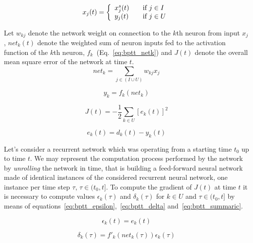 \begin{equation}
x_j(t) = \left\{
\begin{array}{l l}
	x^{s}_{j}(t)	& \quad \text{if $j \in I$} \\
	y_j(t)	& \quad \text{if $j \in U$}\\
\end{array} \right.
\label{eq:bptt_indices}
\end{equation}

\noindent Let $w_{kj}$ denote the network weight on connection to the $k$th neuron from input $x_j$, $net_k(t)$ denote the weighted sum of neuron inputs fed to the activation function of the $k$th neuron, $f_k$~(Eq.~\ref{eq:bptt_netk}) and $J(t)$ denote the overall mean square error of the network at time $t$.
\begin{equation}
net_k = \sum_{j \in (I \cup U)} w_{kj} x_j
\label{eq:bptt_netk}
\end{equation}

\begin{equation}
y_k = f_k(net_k)
\label{eq:bptt_f}
\end{equation}

\begin{equation}
J(t) = -\frac{1}{2} \sum_{k \in U} [e_k(t)]^2
\label{eq:bptt_j}
\end{equation}

\begin{equation}
e_k(t) = d_k(t) - y_k(t)
\label{eq:bptt_e}
\end{equation}

\noindent Let's consider a recurrent network which was operating from a starting time $t_0$ up to time $t$. We may represent the computation process performed by the network by \emph{unrolling} the network in time, that is building a feed-forward neural network made of identical instances of the considered recurrent neural network, one instance per time step $\tau$, $\tau \in (t_0, t]$. To compute the gradient of $J(t)$ at time $t$ it is necessary to compute values $\epsilon_k(\tau)$ and $\delta_k(\tau)$ for $k \in U$ and $\tau \in (t_0, t]$ by means of equations~\ref{eq:bptt_epsilon},~\ref{eq:bptt_delta} and~\ref{eq:bptt_summaric}.

\begin{equation}
\epsilon_k(t) = e_k(t)
\label{eq:bptt_epsilon}
\end{equation}

\begin{equation}
\delta_k(\tau) = f'_k(net_k(\tau))\epsilon_k(\tau)
\label{eq:bptt_delta}
\end{equation}

